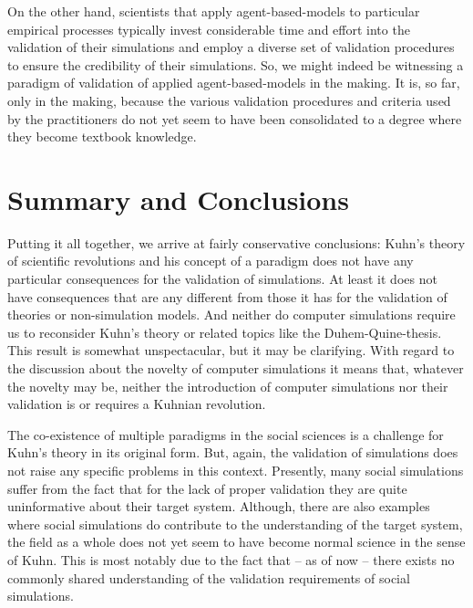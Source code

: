 \documentclass[12pt, a4paper]{article}
\begin{document}
On the other hand, scientists that apply agent-based-models to
particular empirical processes typically invest considerable time and
effort into the validation of their simulations and employ a diverse
set of validation procedures to ensure the credibility of their
simulations. So, we might indeed be witnessing a paradigm of
validation of applied agent-based-models in the making. It is, so far,
only in the making, because the various validation procedures and
criteria used by the practitioners do not yet seem to have been
consolidated to a degree where they become textbook knowledge.


\section{Summary and Conclusions}

Putting it all together, we arrive at fairly conservative conclusions:
Kuhn's theory of scientific revolutions and his concept of a paradigm
does not have any particular consequences for the validation of
simulations. At least it does not have consequences that are any
different from those it has for the validation of theories or
non-simulation models. And neither do computer simulations require us
to reconsider Kuhn's theory or related topics like the
Duhem-Quine-thesis. This result is somewhat unspectacular, but it may
be clarifying. With regard to the discussion about the novelty of
computer simulations it means that, whatever the novelty may be,
neither the introduction of computer simulations nor their validation
is or requires a Kuhnian revolution.

The co-existence of multiple paradigms in the social sciences is a
challenge for Kuhn's theory in its original form. But, again, the
validation of simulations does not raise any specific problems in this
context. Presently, many social simulations suffer from the fact that
for the lack of proper validation they are quite uninformative about
their target system. Although, there are also examples where social
simulations do contribute to the understanding of the target system,
the field as a whole does not yet seem to have become normal science
in the sense of Kuhn. This is most notably due to the fact that -- as
of now -- there exists no commonly shared understanding of the
validation requirements of social simulations.

\printbibliography

% 

% 
\end{document}
